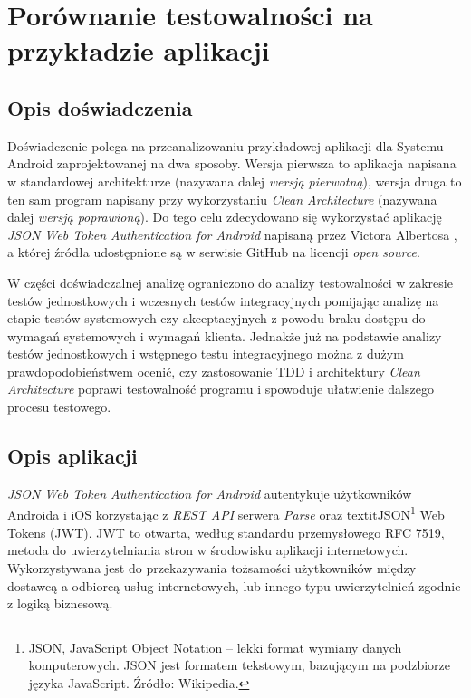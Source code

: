 \chapter{Porównanie testowalności na przykładzie aplikacji}
\label{analiza_testow}

\section{Opis doświadczenia}
Doświadczenie polega na przeanalizowaniu przykładowej aplikacji dla Systemu Android zaprojektowanej na dwa sposoby. Wersja pierwsza to aplikacja napisana w standardowej architekturze (nazywana dalej \textit{wersją pierwotną}), wersja druga to ten sam program napisany przy wykorzystaniu \textit{Clean Architecture} (nazywana dalej \textit{wersją poprawioną}). Do tego celu zdecydowano się wykorzystać
aplikację \textit{JSON Web Token Authentication for Android} napisaną przez Victora Albertosa \cite{website:victor:aplication} , a której źródła udostępnione są w serwisie GitHub na licencji \textit{open source}.

W części doświadczalnej analizę ograniczono do analizy testowalności w zakresie testów jednostkowych i wczesnych testów integracyjnych pomijając analizę na etapie testów systemowych czy akceptacyjnych z powodu braku dostępu do wymagań systemowych i wymagań klienta. Jednakże już na podstawie analizy testów jednostkowych i wstępnego testu integracyjnego można z dużym prawdopodobieństwem ocenić, czy zastosowanie TDD i architektury \textit{Clean Architecture} poprawi testowalność programu i spowoduje ułatwienie dalszego procesu testowego.

\section{Opis aplikacji}
\textit{JSON Web Token Authentication for Android} autentykuje użytkowników Androida i iOS korzystając z \textit{REST API} serwera \textit{Parse} oraz textit{JSON\footnote{JSON, JavaScript Object Notation – lekki format wymiany danych komputerowych. JSON jest formatem tekstowym, bazującym na podzbiorze języka JavaScript. Źródło: Wikipedia.} Web Tokens (JWT)}. JWT to otwarta, według standardu przemysłowego RFC 7519\cite{website:jwt:rfc7519}, metoda do uwierzytelniania stron w środowisku aplikacji internetowych. Wykorzystywana jest do przekazywania tożsamości użytkowników między dostawcą a odbiorcą usług internetowych, lub innego typu uwierzytelnień zgodnie z logiką biznesową. 


